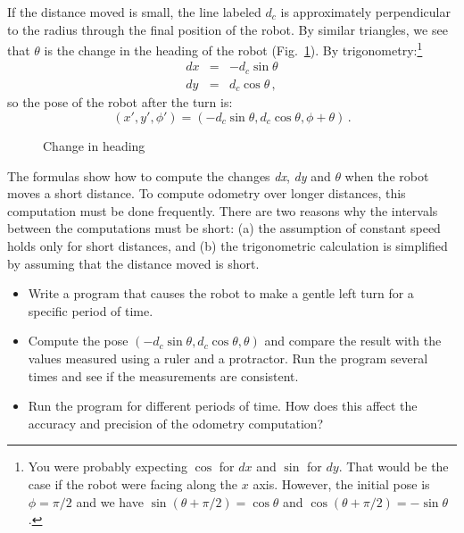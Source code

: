 If the distance moved is small, the line labeled $d_c$ is approximately
perpendicular to the radius through the final position of the robot. By similar triangles, we see that $\theta$ is the change in the heading of the robot (Fig.~\ref{fig.heading}). By trigonometry:\footnote{You were probably expecting $\cos$ for $dx$ and $\sin$ for $dy$. That would be the case if the robot were facing along the $x$ axis. However, the initial pose is $\phi=\pi/2$ and we have $\sin(\theta+\pi/2)=\cos\theta$ and $\cos(\theta+\pi/2)=-\sin\theta$.}
\begin{eqnarray*}
\textit{dx} &=& - d_c \sin \theta\\
\textit{dy} &=& d_c \cos \theta\,,
\end{eqnarray*}
so the pose of the robot after the turn is:
\[
(x',y',\phi') = ( - d_c \sin \theta, d_c \cos \theta, \phi+\theta)\,.
\]

\begin{figure}
\begin{center}
\end{center}
\caption{Change in heading}\label{fig.heading}
\end{figure}

The formulas show how to compute the changes \textit{dx}, \textit{dy} and $\theta$ when the robot moves a short distance. To compute odometry over longer distances, this computation must be done frequently. There are two reasons why the intervals between the computations must be short: (a) the assumption of constant speed holds only for short distances, and (b) the trigonometric calculation is simplified by assuming that the distance moved is short.

\begin{framed}
\begin{itemize}
\item Write a program that causes the robot to make a gentle left turn for a specific period of time.
\item Compute the pose $( - d_c \sin \theta, d_c \cos \theta, \theta)$ and compare the result with the values measured using a ruler and a protractor. Run the program several times and see if the measurements are consistent.
\item Run the program for different periods of time. How does this affect the accuracy and precision of the odometry computation?
\end{itemize}
\end{framed}

